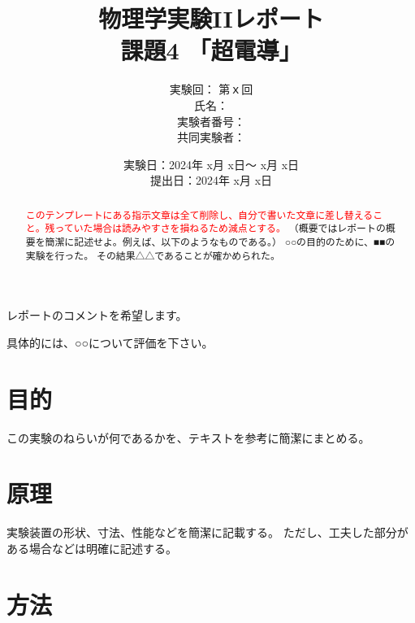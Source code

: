 \documentclass[uplatex,dvipdfmx,a4j,12pt]{jsarticle}
\title{
  物理学実験IIレポート\\    %
  課題4 「超電導」
  }
\author{
  実験回： 第ｘ回 \\
  氏名： \\
  実験者番号：
  \\
  共同実験者：
  }
\date{
  実験日：2024年 x月 x日～ x月 x日 \\
  提出日：2024年 x月 x日}  %
\begin{document}
\maketitle


\vspace{2em}
\begin{center}
    \begin{minipage}{0.5\linewidth}
        レポートのコメントを希望します。

        具体的には、○○について評価を下さい。
    \end{minipage}
\end{center}

\vspace{5em}  


%
\begin{abstract}
    \textcolor{red}{このテンプレートにある指示文章は全て削除し、自分で書いた文章に差し替えること。残っていた場合は読みやすさを損ねるため減点とする。}
    （概要ではレポートの概要を簡潔に記述せよ。例えば、以下のようなものである。）
    ○○の目的のために、■■の実験を行った。
    その結果△△であることが確かめられた。
\end{abstract}

\newpage


\section{目的}
この実験のねらいが何であるかを、テキストを参考に簡潔にまとめる。


\section{原理}
実験装置の形状、寸法、性能などを簡潔に記載する。
ただし、工夫した部分がある場合などは明確に記述する。


\section{方法}
\end{document}
